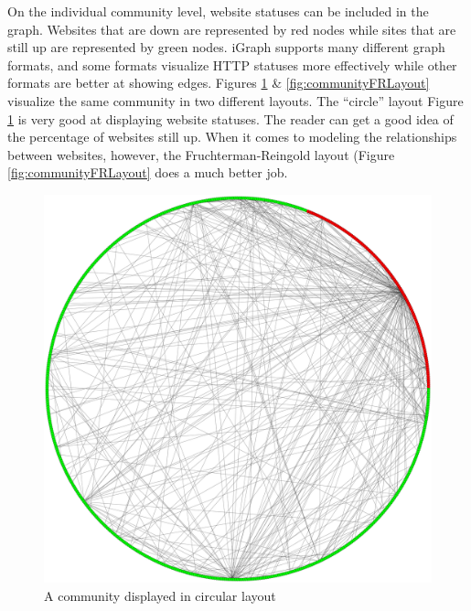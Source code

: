 \documentclass[conference]{IEEEtran}
\begin{document}
On the individual community level, website statuses can be included in the graph. Websites that are down are represented by red nodes while sites that are still up are represented by green nodes. iGraph supports many different graph formats, and some formats visualize HTTP statuses more effectively while other formats are better at showing edges. Figures \ref{fig:communityCircularLayout} \& \ref{fig:communityFRLayout} visualize the same community in two different layouts. The “circle” layout Figure \ref{fig:communityCircularLayout} is very good at displaying website statuses. The reader can get a good idea of the percentage of websites still up. When it comes to modeling the relationships between websites, however, the Fruchterman-Reingold layout \cite{fruchterman1991graph}(Figure \ref{fig:communityFRLayout} does a much better job.

\begin{figure}[htbp]
 \centerline{\includegraphics[width=\columnwidth]{community-circular.png}}
 \caption{A community displayed in circular layout}
 \label{fig:communityCircularLayout}
\end{figure}
\end{document}
